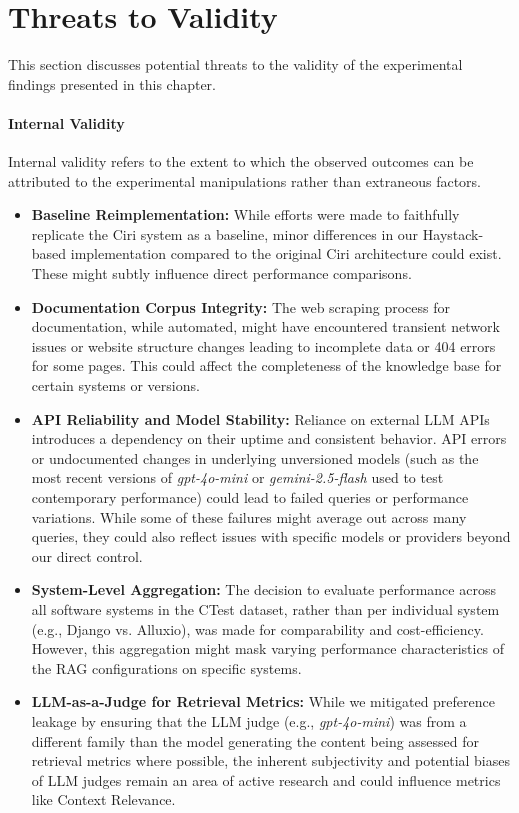 \section{Threats to Validity} \label{sec:exp_threats}

This section discusses potential threats to the validity of the experimental findings presented in this chapter.

\paragraph{Internal Validity}
Internal validity refers to the extent to which the observed outcomes can be attributed to the experimental manipulations rather than extraneous factors.

\begin{itemize}
    \item \textbf{Baseline Reimplementation:} While efforts were made to faithfully replicate the Ciri system as a baseline, minor differences in our Haystack-based implementation compared to the original Ciri architecture could exist. These might subtly influence direct performance comparisons.
    \item \textbf{Documentation Corpus Integrity:} The web scraping process for documentation, while automated, might have encountered transient network issues or website structure changes leading to incomplete data or 404 errors for some pages. This could affect the completeness of the knowledge base for certain systems or versions.
    \item \textbf{API Reliability and Model Stability:} Reliance on external LLM APIs introduces a dependency on their uptime and consistent behavior. API errors or undocumented changes in underlying unversioned models (such as the most recent versions of \textit{gpt-4o-mini} or \textit{gemini-2.5-flash} used to test contemporary performance) could lead to failed queries or performance variations. While some of these failures might average out across many queries, they could also reflect issues with specific models or providers beyond our direct control.
    \item \textbf{System-Level Aggregation:} The decision to evaluate performance across all software systems in the CTest dataset, rather than per individual system (e.g., Django vs. Alluxio), was made for comparability and cost-efficiency. However, this aggregation might mask varying performance characteristics of the RAG configurations on specific systems.
    \item \textbf{LLM-as-a-Judge for Retrieval Metrics:} While we mitigated preference leakage by ensuring that the LLM judge (e.g., \textit{gpt-4o-mini}) was from a different family than the model generating the content being assessed for retrieval metrics where possible, the inherent subjectivity and potential biases of LLM judges remain an area of active research and could influence metrics like Context Relevance.
\end{itemize}


